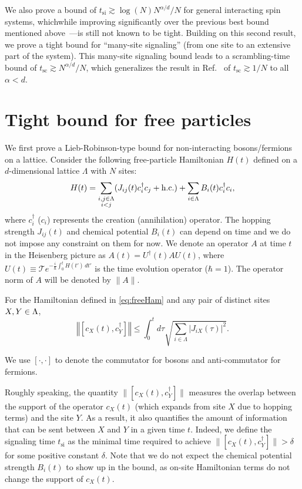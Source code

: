We also prove a bound of $t_{\text{si}}\gtrsim \log(N)N^{\alpha/d}/N$ for general interacting spin systems, which\dash while improving significantly over the previous best bound mentioned above~\cite{Storch15}---is still not known to be tight.
Building on this second result, we prove a tight bound for ``many-site signaling'' (from one site to an extensive part of the system).
This many-site signaling bound leads to a scrambling-time bound of $t_\text{sc}\gtrsim N^{\alpha/d}/N$, which generalizes the result in Ref.~\cite{Lashkari2013} of $t_\text{sc} \gtrsim 1/N$ to all $\alpha<d$.

\section{Tight bound for free particles}
We first prove a Lieb-Robinson-type bound for non-interacting bosons/fermions on a lattice. Consider the following free-particle Hamiltonian $H(t)$ defined on a $d$-dimensional lattice $\Lambda$ with $N$ sites:
 \begin{equation}
    \label{eq:freeHam}
 	H(t) = \sum_{\substack{i,j\in\Lambda \\ i< j}} (J_{ij}(t) c_i^\dagger c_j + \text{h.c.}) + \sum_{i\in\Lambda}B_{i}(t)c_i^\dagger c_i,
    \end{equation}
where $c_i^\dagger$ ($c_i$) represents the creation (annihilation) operator. The hopping strength $J_{ij}(t)$ and chemical potential $B_i(t)$ can depend on time and we do not impose any constraint on them for now. We denote an operator $A$ at time $t$ in the Heisenberg picture as $A(t)=U^\dagger(t)A U(t)$, where $U(t) \equiv \mathcal{T} e^{-\frac i \hbar \int_0^t H(t')\,dt'}$ is the time evolution operator ($\hbar = 1$). The operator norm of $A$ will be denoted by $\|A\|$.
\begin{theorem}
    \label{eq:tightbound}
For the Hamiltonian defined in \cref{eq:freeHam} and any pair of distinct sites $X, Y \in \Lambda$,
\begin{equation}
    \label{eq:tightboundeq}
    \left\Vert \left[c_{X}(t),c_{Y}^{\dagger}\right]\right\Vert \le  \int_{0}^{t}d\tau\sqrt{\sum_{i\in\Lambda}\left|J_{iX}(\tau)\right|^{2}}.
\end{equation}
\end{theorem}
We use $[\cdot,\cdot]$ to denote the commutator for bosons and anti-commutator for fermions.

Roughly speaking, the quantity $\|[c_{X}(t),c_{Y}^{\dagger}]\|$ measures the overlap between the support of the operator $c_{X}(t)$ (which expands from site $X$ due to hopping terms) and the site $Y$.
As a result, it also quantifies the amount of information that can be sent between $X$ and $Y$ in a given time $t$.
Indeed, we define the signaling time $t_\text{si}$ as the minimal time required to achieve $\|[c_{X}(t),c_{Y}^{\dagger}]\| > \delta$ for some positive constant $\delta$.
Note that we do not expect the chemical potential strength $B_i(t)$ to show up in the bound, as on-site Hamiltonian terms do not change the support of $c_X(t)$.

